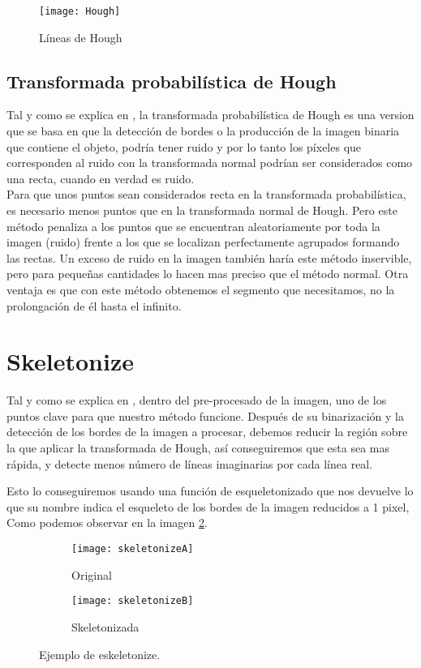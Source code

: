 \begin{figure}[h]
\centering
\texttt{[image: Hough]}
\caption{Líneas de Hough\cite{opencv:HoughIm}}
\label{fig:3.5}
\end{figure}
\subsection{Transformada probabilística de Hough}

Tal y como se explica en \cite{Kiryati20001157}, la transformada probabilística de Hough es una version que se basa en que la detección de bordes o la producción de la imagen binaria que contiene el objeto, podría tener ruido y por lo tanto los píxeles que corresponden al ruido con la transformada normal podrían ser considerados como una recta, cuando en verdad es ruido.\\

Para que unos puntos sean considerados recta en la transformada probabilística, es necesario menos puntos que en la transformada normal de Hough.
Pero este método penaliza a los puntos que se encuentran aleatoriamente por toda la imagen (ruido) frente a los que se localizan perfectamente agrupados formando las rectas. 
Un exceso de ruido en la imagen también haría este método inservible, pero para pequeñas cantidades lo hacen mas preciso que el método normal.
Otra ventaja es que con este método obtenemos el segmento que necesitamos, no la prolongación de él hasta el infinito.

\section{Skeletonize }
Tal y como se explica en \cite{scik:skeleton}, dentro del pre-procesado de la imagen, uno de los puntos clave para que nuestro método funcione.
Después de su binarización y la detección de los bordes de la imagen a procesar, debemos reducir la región sobre la que aplicar la transformada de Hough, así conseguiremos que esta sea mas rápida, y detecte menos número de líneas imaginarias por cada línea real.

Esto lo conseguiremos usando una función de esqueletonizado que nos devuelve lo que su nombre indica el esqueleto de los bordes de la imagen reducidos a 1 pixel, Como podemos observar en la imagen \ref{fig:3.6}.


\begin{figure}
\begin{subfigure}[b]{.5\linewidth}
\centering\large \texttt{[image: skeletonizeA]}
\caption{Original}
\end{subfigure}%
\begin{subfigure}[b]{.5\linewidth}
\centering\large \texttt{[image: skeletonizeB]}
\caption{Skeletonizada}
\end{subfigure}
\caption{Ejemplo de eskeletonize.}\label{fig:3.6}
\end{figure}


